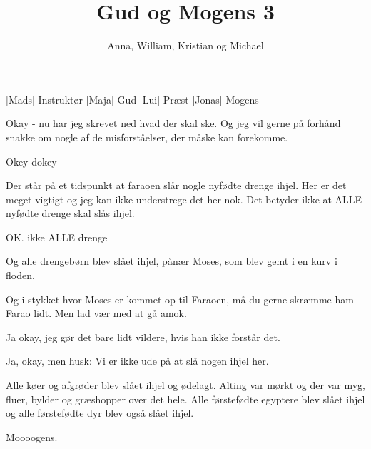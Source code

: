\documentclass[a4paper,11pt]{article}
\title{Gud og Mogens 3}
\author{Anna, William, Kristian og Michael}
\begin{document}
\maketitle

\begin{roles}
[Mads] Instruktør
[Maja] Gud
[Lui] Præst
[Jonas] Mogens
\end{roles}


  
\begin{sketch}


 Okay - nu har jeg skrevet ned hvad der skal ske. Og jeg vil gerne på forhånd snakke om nogle af de misforståelser, der måske kan forekomme.

 Okey dokey

 Der står på et tidspunkt at faraoen slår nogle nyfødte drenge ihjel. Her er det meget vigtigt og jeg kan ikke understrege det her nok. Det betyder ikke at ALLE nyfødte drenge skal slås ihjel.

 OK. ikke ALLE drenge 

  Og alle drengebørn blev slået ihjel, pånær Moses, som blev gemt i en kurv i floden.

 Og i stykket hvor Moses er kommet op til Faraoen, må du gerne skræmme ham Farao lidt. Men lad vær med at gå amok. 

  Ja okay, jeg gør det bare lidt vildere, hvis han ikke forstår det.

 Ja, okay, men husk: Vi er ikke ude på at slå nogen ihjel her.

 Alle køer og afgrøder blev slået ihjel og ødelagt. Alting var mørkt og der var myg, fluer, bylder og græshopper over det hele. Alle førstefødte egyptere blev slået ihjel og alle førstefødte dyr blev også slået ihjel.

 Moooogens.




\end{sketch}
\end{document}
